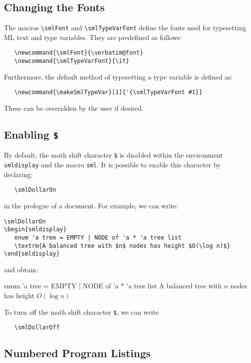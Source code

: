 \subsection{Changing the Fonts}
The macros \verb|\smlFont| and \verb|\smlTypeVarFont| 
define the fonts used for typesetting ML text and type variables.  
They are predefined as follows:
\begin{verbatim}
   \newcommand{\smlFont}{\verbatim@font}
   \newcommand{\smlTypeVarFont}{\it}
\end{verbatim}
Furthermore, the default method of typesetting a type variable
is defined as: 
\begin{verbatim}
   \newcommand{\makeSmlTypeVar}[1]{'{\smlTypeVarFont #1}}
\end{verbatim}
These can be overridden by the user if desired.

\subsection{Enabling {\tt \$}}
By default, the math shift character \verb|$| 
is disabled within the environment \verb|smldisplay|
and the macro \verb|sml|.  It is possible to
enable this character by declaring:
\begin{verbatim}
   \smlDollarOn
\end{verbatim}
\noindent in the prologue of a document.
For example, we can write:
\begin{verbatim}
\smlDollarOn
\begin{smldisplay}
   enum 'a tree = EMPTY | NODE of 'a * 'a tree list
   \textrm{A balanced tree with $n$ nodes has height $O(\log n)$}
\end{smldisplay}
\end{verbatim}
and obtain:
\smlDollarOn
\begin{smldisplay}
   enum 'a tree = EMPTY | NODE of 'a * 'a tree list
   \textrm{A balanced tree with $n$ nodes has height $O(\log n)$}
\end{smldisplay}

To turn off the math shift character \verb|$|, we can
write 
\begin{verbatim}
   \smlDollarOff
\end{verbatim}

\subsection{Numbered Program Listings}

